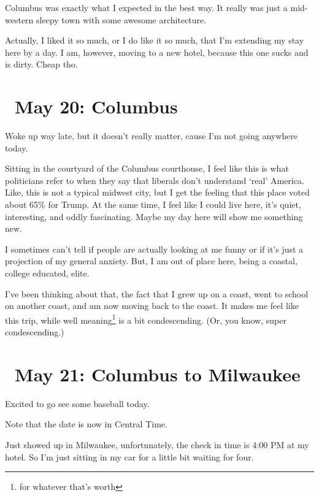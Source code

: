 \documentclass[../butidigress.tex]{subfiles}
\begin{document}
\entryskip

Columbus was exactly what I expected in the best way.
It really was just a mid-western sleepy town with some awesome architecture.

Actually, I liked it so much, or I do like it so much, that I'm extending my stay here by a day.
I am, however, moving to a new hotel, because this one sucks and is dirty.
Cheap tho.

\section{\ May 20: Columbus}
Woke up way late, but it doesn't really matter, cause I'm not going anywhere today.

\entryskip

Sitting in the courtyard of the Columbus courthouse, I feel like this is what politicians refer to when they say that liberals don't understand `real' America.
Like, this is not a typical midwest city, but I get the feeling that this place voted about 65\% for Trump.
At the same time, I feel like I could live here, it's quiet, interesting, and oddly fascinating.
Maybe my day here will show me something new.

I sometimes can't tell if people are actually looking at me funny or if it's just a projection of my general anxiety.
But, I am out of place here, being a coastal, college educated, elite.

I've been thinking about that, the fact that I grew up on a coast, went to school on another coast, and am now moving back to the coast.
It makes me feel like this trip, while well meaning\footnote{for whatever that's worth} is a bit condescending.
(Or, you know, super condescending.)

\section{\ May 21: Columbus to Milwaukee}
Excited to go see some baseball today.

\entryskip

Note that the date is now in Central Time.

Just showed up in Milwaukee, unfortunately, the check in time is 4:00 PM at my hotel.
So I'm just sitting in my car for a little bit waiting for four.
\end{document}
